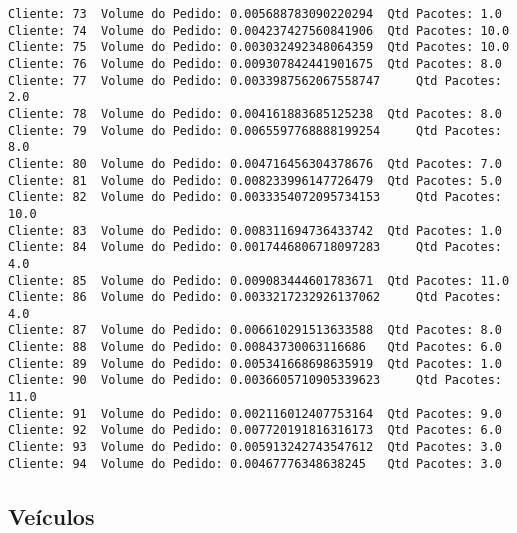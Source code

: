 \documentclass[11pt]{article}
\begin{document}
\begin{Verbatim}[commandchars=\\\{\}]
Cliente: 73	 Volume do Pedido: 0.005688783090220294	 Qtd Pacotes: 1.0
Cliente: 74	 Volume do Pedido: 0.004237427560841906	 Qtd Pacotes: 10.0
Cliente: 75	 Volume do Pedido: 0.003032492348064359	 Qtd Pacotes: 10.0
Cliente: 76	 Volume do Pedido: 0.009307842441901675	 Qtd Pacotes: 8.0
Cliente: 77	 Volume do Pedido: 0.0033987562067558747	 Qtd Pacotes: 2.0
Cliente: 78	 Volume do Pedido: 0.004161883685125238	 Qtd Pacotes: 8.0
Cliente: 79	 Volume do Pedido: 0.0065597768888199254	 Qtd Pacotes: 8.0
Cliente: 80	 Volume do Pedido: 0.004716456304378676	 Qtd Pacotes: 7.0
Cliente: 81	 Volume do Pedido: 0.008233996147726479	 Qtd Pacotes: 5.0
Cliente: 82	 Volume do Pedido: 0.0033354072095734153	 Qtd Pacotes: 10.0
Cliente: 83	 Volume do Pedido: 0.008311694736433742	 Qtd Pacotes: 1.0
Cliente: 84	 Volume do Pedido: 0.0017446806718097283	 Qtd Pacotes: 4.0
Cliente: 85	 Volume do Pedido: 0.009083444601783671	 Qtd Pacotes: 11.0
Cliente: 86	 Volume do Pedido: 0.0033217232926137062	 Qtd Pacotes: 4.0
Cliente: 87	 Volume do Pedido: 0.006610291513633588	 Qtd Pacotes: 8.0
Cliente: 88	 Volume do Pedido: 0.00843730063116686	 Qtd Pacotes: 6.0
Cliente: 89	 Volume do Pedido: 0.005341668698635919	 Qtd Pacotes: 1.0
Cliente: 90	 Volume do Pedido: 0.0036605710905339623	 Qtd Pacotes: 11.0
Cliente: 91	 Volume do Pedido: 0.002116012407753164	 Qtd Pacotes: 9.0
Cliente: 92	 Volume do Pedido: 0.007720191816316173	 Qtd Pacotes: 6.0
Cliente: 93	 Volume do Pedido: 0.005913242743547612	 Qtd Pacotes: 3.0
Cliente: 94	 Volume do Pedido: 0.00467776348638245	 Qtd Pacotes: 3.0

    \end{Verbatim}

    \subsection{Veículos}\label{veuxedculos}


    
    
    
    
\end{document}
